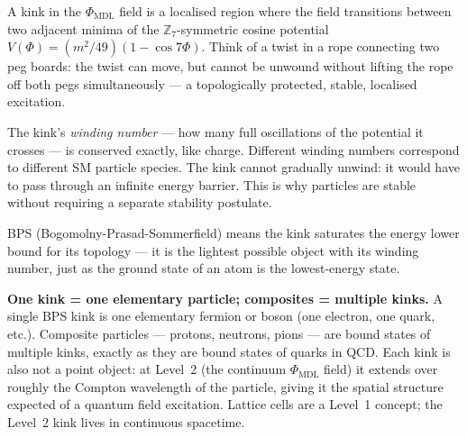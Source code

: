 \documentclass[11pt,openany]{book}
\theoremstyle{remark}
\newcommand{\PHIMDL}{\Phi_{\mathrm{MDL}}}
\begin{document}
\begin{tcolorbox}[colback=teal!4,colframe=teal!55!black,
  title={\textbf{Why a Kink Is a Particle}},
  fonttitle=\small\bfseries, left=6pt, right=6pt, top=4pt, bottom=4pt]
\small
A kink in the $\PHIMDL$ field is a localised region where the field transitions between
two adjacent minima of the $\mathbb{Z}_7$-symmetric cosine potential
$V(\Phi) = (m^2/49)(1-\cos 7\Phi)$.
Think of a twist in a rope connecting two peg boards: the twist can move, but cannot
be unwound without lifting the rope off both pegs simultaneously --- a topologically
protected, stable, localised excitation.

The kink's \emph{winding number} --- how many full oscillations of the potential it crosses
--- is conserved exactly, like charge.
Different winding numbers correspond to different SM particle species.
The kink cannot gradually unwind: it would have to pass through an infinite energy barrier.
This is why particles are stable without requiring a separate stability postulate.

\smallskip\noindent
BPS (Bogomolny-Prasad-Sommerfield) means the kink saturates the energy lower bound for
its topology --- it is the lightest possible object with its winding number, just as
the ground state of an atom is the lowest-energy state.

\smallskip\noindent
\textbf{One kink = one elementary particle; composites = multiple kinks.}
A single BPS kink is one elementary fermion or boson (one electron, one quark, etc.).
Composite particles --- protons, neutrons, pions --- are bound states of multiple kinks,
exactly as they are bound states of quarks in QCD.
Each kink is also not a point object: at Level~2 (the continuum $\PHIMDL$ field)
it extends over roughly the Compton wavelength of the particle, giving it the spatial
structure expected of a quantum field excitation.
Lattice cells are a Level~1 concept; the Level~2 kink lives in continuous spacetime.
\end{tcolorbox}

\medskip
\end{document}
